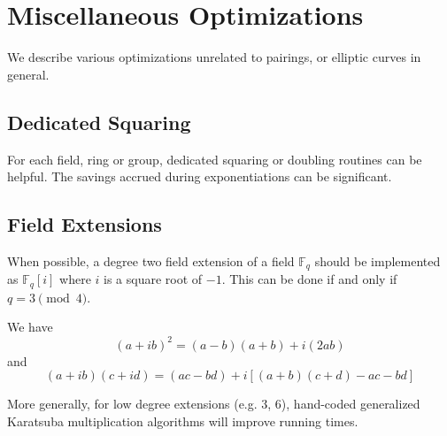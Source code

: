 \chapter{Miscellaneous Optimizations}

We describe various
optimizations unrelated to pairings, or elliptic curves in general.

\section{Dedicated Squaring}

For each field, ring or group, dedicated squaring or doubling routines
can be helpful. The savings accrued during exponentiations can be significant.

\section{Field Extensions}

When possible, a degree two field extension of a field $\mathbb{F}_q$
should be implemented as $\mathbb{F}_q[i]$ where $i$ is a square root of $-1$.
This can be done if and only if $q = 3 \pmod{4}$.

We have
\[ (a + i b)^2 = (a - b)(a + b) + i (2 a b) \]
and
\[ (a + i b)(c + i d) = (ac - bd) + i[(a + b)(c + d) - ac - bd] \]

More generally, for low degree extensions (e.g. 3, 6),
hand-coded generalized Karatsuba multiplication algorithms \cite{someone} will
improve running times.
